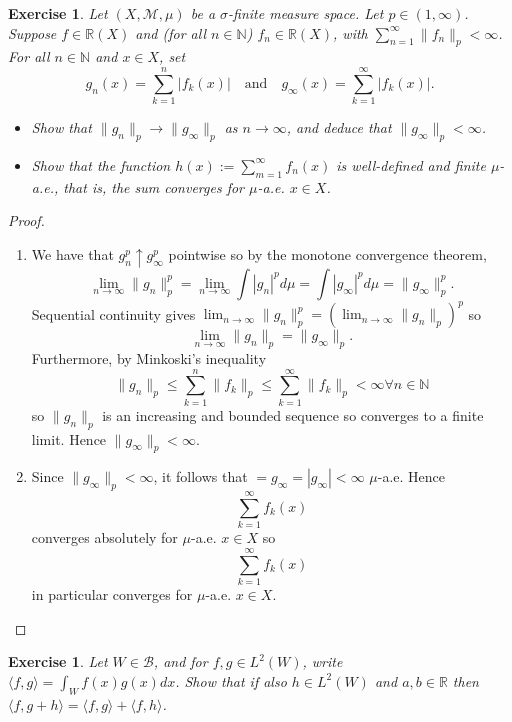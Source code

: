 \documentclass{article}
\newtheorem{exercise}[theorem]{Exercise}
\begin{document}
\begin{exercise}
Let $(X, \mathcal{M}, \mu)$ be a $\sigma$-finite measure space. Let $p \in (1, \infty)$. Suppose $f \in \mathbb{R}(X)$ and (for all $n \in \mathbb{N}$) $f_n \in \mathbb{R}(X)$, with $\sum_{n=1}^{\infty} \|f_n\|_p < \infty$. For all $n \in \mathbb{N}$ and $x \in X$, set
\[
g_n(x) = \sum_{k=1}^{n} |f_k(x)| \quad \text{and} \quad g_{\infty}(x) = \sum_{k=1}^{\infty} |f_k(x)|.
\]
\begin{itemize}
    \item[(i)] Show that $\|g_n\|_p \to \|g_{\infty}\|_p$ as $n \to \infty$, and deduce that $\|g_{\infty}\|_p < \infty$.
    
    \item[(ii)] Show that the function $h(x) := \sum_{m=1}^{\infty} f_n(x)$ is well-defined and finite $\mu$-a.e., that is, the sum converges for $\mu$-a.e. $x \in X$.
\end{itemize}
\end{exercise}
\begin{proof}
\begin{enumerate}
    \item[(a)] We have that $g_n^p\uparrow g_\infty^p$ pointwise so by the monotone convergence theorem,\[\lim_{n\to\infty}\|g_n\|_p^p=\lim_{n\to\infty}\int|g_n|^pd\mu=\int|g_\infty|^pd\mu=\|g_\infty\|_p^p.\] Sequential continuity gives $\lim_{n\to\infty}\|g_n\|_p^p=\left(\lim_{ n\to\infty}\|g_n\|_p\right)^p$ so\[\lim_{n\to\infty}\|g_n\|_p=\|g_\infty\|_p.\] Furthermore, by Minkoski's inequality \[\|g_n\|_p\leq\sum_{k=1}^n\|f_k\|_p\leq\sum_{k=1}^\infty\|f_k\|_p<\infty\forall n\in\mathbb{N}\] so $\|g_n\|_p$ is an increasing and bounded sequence so converges to a finite limit. Hence $\|g_\infty\|_p<\infty$.
    \item[(b)] Since $\|g_\infty\|_p<\infty$, it follows that $=g_\infty=|g_\infty|<\infty$ $\mu$-a.e. Hence \[\sum_{k=1}^\infty f_k(x)\] converges absolutely for $\mu$-a.e. $x\in X$ so \[\sum_{k=1}^\infty f_k(x)\] in particular converges for $\mu$-a.e. $x\in X$.
\end{enumerate}
\end{proof}

\begin{exercise}
Let $W \in \mathcal{B}$, and for $f, g \in L^2(W)$, write $\langle f, g \rangle = \int_W f(x)g(x)dx$. Show that if also $h \in L^2(W)$ and $a, b \in \mathbb{R}$ then $\langle f, g + h \rangle = \langle f, g \rangle + \langle f, h \rangle$.
\end{exercise}
\end{document}
